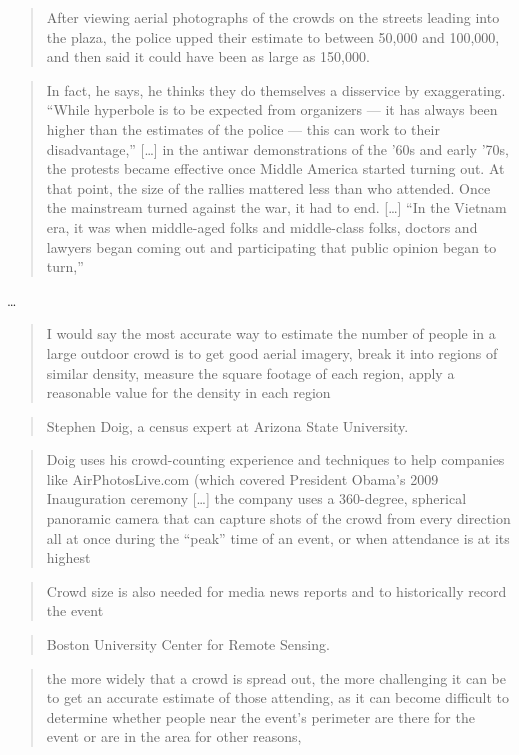 \blockcquote{TheCrowdNumbersGame}{%
  After viewing aerial photographs of the crowds on the streets leading into the 
  plaza, the police upped their estimate to between 50,000 and 100,000, and 
  then said it could have been as large as 150,000.%
}

\blockcquote{TheCrowdNumbersGame}{%
  In fact, he says, he thinks they do themselves a disservice by exaggerating. 
  “While hyperbole is to be expected from organizers — it has always been higher 
  than the estimates of the police — this can work to their disadvantage,”
  [\dots]
  in the antiwar demonstrations of the ’60s and early ’70s, the protests became 
  effective once Middle America started turning out. At that point, the size of 
  the rallies mattered less than who attended. Once the mainstream turned against 
  the war, it had to end.
  [\dots]
  “In the Vietnam era, it was when middle-aged folks and middle-class folks, 
  doctors and lawyers began coming out and participating that public opinion 
  began to turn,”%
}

\Textcite{HowToEstimateCrowdSize} \dots

\blockcquote[Interview with Stephen Doig, ASU]{HowToEstimateCrowdSize}{%
  I would say the most accurate way to estimate the number of people in a large 
  outdoor crowd is to get good aerial imagery, break it into regions of similar 
  density, measure the square footage of each region, apply a reasonable value 
  for the density in each region%
}
\blockcquote{HowToEstimateCrowdSize}{%
  Stephen Doig, a census expert at Arizona State University.%
}

\blockcquote{HowToEstimateCrowdSize}{%
  Doig uses his crowd-counting experience and techniques to help companies like 
  AirPhotosLive.com (which covered President Obama's 2009 Inauguration ceremony
  [\dots]
  the company uses a 360-degree, spherical panoramic camera that can capture 
  shots of the crowd from every direction all at once during the \enquote{peak} 
  time of an event, or when attendance is at its highest%
}

\blockcquote{HowToEstimateCrowdSize}{%
  Crowd size is also needed for media news reports and to historically record 
  the event%
}

\blockcquote{HowToEstimateCrowdSize}{%
  Boston University Center for Remote Sensing.%
}

\blockcquote{HowToEstimateCrowdSize}{%
  the more widely that a crowd is spread out, the more challenging it can be to 
  get an accurate estimate of those attending, as it can become difficult to 
  determine whether people near the event's perimeter are there for the event 
  or are in the area for other reasons,%
}

